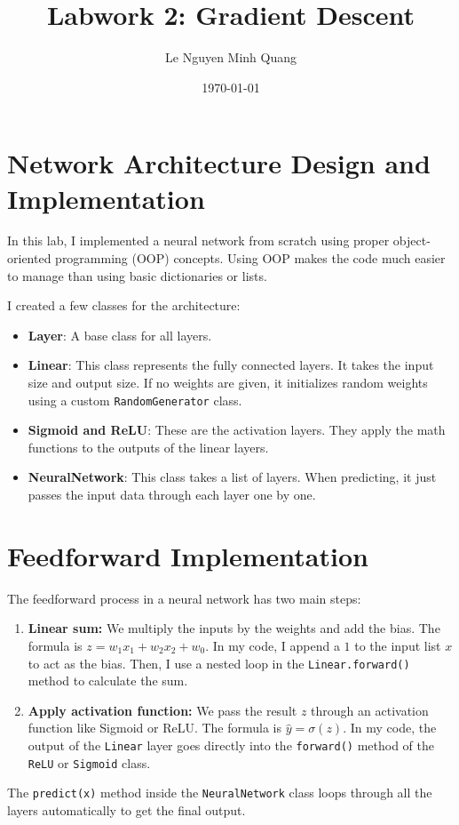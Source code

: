 \documentclass{article}
\title{Labwork 2: Gradient Descent}
\author{Le Nguyen Minh Quang}
\date{\today}
\begin{document}
\maketitle

\section{Network Architecture Design and Implementation}
In this lab, I implemented a neural network from scratch using proper object-oriented programming (OOP) concepts. Using OOP makes the code much easier to manage than using basic dictionaries or lists. 

I created a few classes for the architecture:
\begin{itemize}
    \item \textbf{Layer}: A base class for all layers.
    \item \textbf{Linear}: This class represents the fully connected layers. It takes the input size and output size. If no weights are given, it initializes random weights using a custom \texttt{RandomGenerator} class.
    \item \textbf{Sigmoid and ReLU}: These are the activation layers. They apply the math functions to the outputs of the linear layers.
    \item \textbf{NeuralNetwork}: This class takes a list of layers. When predicting, it just passes the input data through each layer one by one.
\end{itemize}

\section{Feedforward Implementation}
The feedforward process in a neural network has two main steps:
\begin{enumerate}
    \item \textbf{Linear sum:} We multiply the inputs by the weights and add the bias. The formula is $z = w_1 x_1 + w_2 x_2 + w_0$. In my code, I append a $1$ to the input list $x$ to act as the bias. Then, I use a nested loop in the \texttt{Linear.forward()} method to calculate the sum.
    \item \textbf{Apply activation function:} We pass the result $z$ through an activation function like Sigmoid or ReLU. The formula is $\hat{y} = \sigma(z)$. In my code, the output of the \texttt{Linear} layer goes directly into the \texttt{forward()} method of the \texttt{ReLU} or \texttt{Sigmoid} class.
\end{enumerate}
The \texttt{predict(x)} method inside the \texttt{NeuralNetwork} class loops through all the layers automatically to get the final output.
\end{document}
